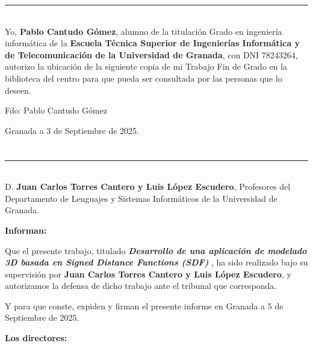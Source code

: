 \noindent\rule[-1ex]{\textwidth}{2pt}\\[4.5ex]

Yo, \textbf{Pablo Cantudo Gómez}, alumno de la titulación Grado en ingeniería informática de la \textbf{Escuela Técnica Superior
de Ingenierías Informática y de Telecomunicación de la Universidad de Granada}, con DNI 78243264, autorizo la
ubicación de la siguiente copia de mi Trabajo Fin de Grado en la biblioteca del centro para que pueda ser
consultada por las personas que lo deseen.

\vspace{6cm}

\noindent Fdo: Pablo Cantudo Gómez

\vspace{2cm}

\begin{flushright}
Granada a 3 de Septiembre de 2025.
\end{flushright}


\chapter*{}
\thispagestyle{empty}

\noindent\rule[-1ex]{\textwidth}{2pt}\\[4.5ex]

D. \textbf{Juan Carlos Torres Cantero y Luis López Escudero}, Profesores del Departamento de Lenguajes y Sistemas Informáticos de la Universidad de Granada.

\vspace{0.5cm}

\textbf{Informan:}

\vspace{0.5cm}

Que el presente trabajo, titulado \textit{\textbf{Desarrollo de una aplicación
de modelado 3D
basada en Signed Distance Functions (SDF)
}},
ha sido realizado bajo su supervisión por \textbf{Juan Carlos Torres Cantero y Luis López Escudero}, y autorizamos la defensa de dicho trabajo ante el tribunal
que corresponda.

\vspace{0.5cm}

Y para que conste, expiden y firman el presente informe en Granada a 5 de Septiembre de 2025.

\vspace{1cm}

\textbf{Los directores:}

\vspace{5cm}

